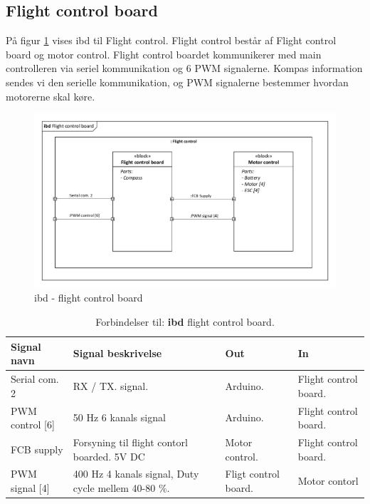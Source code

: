 \subsection{Flight control board}

På figur \ref{fig:ibd_flightcontrolboard} vises ibd til Flight control. Flight control består af Flight control board og motor control. Flight control boardet kommunikerer med main controlleren via seriel kommunikation og 6 PWM signalerne. Kompas information sendes vi den serielle kommunikation, og PWM signalerne bestemmer hvordan motorerne skal køre. 

\begin{figure}[H]
\centering
\includegraphics[width=1\textwidth]{Billeder/IBD/ibd5_flightcontrolboard.pdf}
\vspace{-1cm}
\caption{ibd - flight control board}
\label{fig:ibd_flightcontrolboard}
\end{figure}

\begin{table}[H]
	\centering
		\begin{tabular}{|p{2.6 cm}|p{4.9 cm}|p{2.5 cm}|p{2.5 cm}|} 
		\hline
			\textbf{Signal navn} 	& \textbf{Signal beskrivelse}		& \textbf{Out} 				& \textbf{In}     \\ \hline
			Serial com. 2 & RX / TX. signal. & Arduino. & Flight control board.			    \\ \hline
			PWM control [6] & 50 Hz 6 kanals signal & Arduino. & Flight control board.				\\ \hline
			FCB supply &  Forsyning til flight contorl boarded. 5V DC & Motor control. & Flight control board.	\\ \hline
			PWM signal [4] & 400 Hz 4 kanals signal, Duty cycle mellem 40-80 $\%$. & Fligt control board. & Motor contorl   \\ \hline 
		\end{tabular}
	\caption{Forbindelser til: \textbf{ibd} flight control board. }
	\label{tab:ibd_Flight_control_board}
\end{table}



